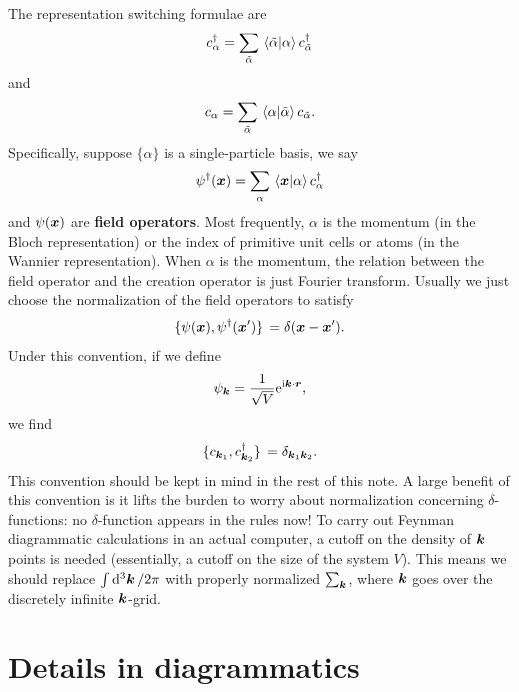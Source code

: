 \documentclass[hyperref, a4paper]{report}
\newcommand*{\ii}{\mathrm{i}}
\newcommand*{\ee}{\mathrm{e}}
\newcommand*{\concept}[1]{{\textbf{#1}}}
\begin{document}
The representation switching formulae are 
\begin{equation}
    c_\alpha^\dagger = \sum_{\tilde{\alpha}} \braket*{\tilde{\alpha}}{\alpha} c_{\tilde{\alpha}}^\dagger
\end{equation}
and 
\begin{equation}
    c_\alpha = \sum_{\tilde{\alpha}} \braket*{\alpha}{\tilde{\alpha}} c_{\tilde{\alpha}}.
\end{equation}
Specifically, suppose $\{\alpha\}$ is a single-particle basis, 
we say 
\begin{equation}
    \psi^\dagger(\vb*{x}) = \sum_{\alpha} \braket*{\vb*{x}}{\alpha} c_\alpha^\dagger
\end{equation}
and $\psi(\vb*{x})$ are \concept{field operators}.
Most frequently, $\alpha$ is the momentum (in the Bloch representation) 
or the index of primitive unit cells or atoms (in the Wannier representation).
When $\alpha$ is the momentum, 
the relation between the field operator and the creation operator 
is just Fourier transform.
Usually we just choose the normalization of the field operators to satisfy 
\begin{equation}
    \acomm*{\psi(\vb*{x})}{\psi^\dagger(\vb*{x}')} = \delta(\vb*{x} - \vb*{x}').
\end{equation}
Under this convention, 
if we define 
\begin{equation}
    \psi_{\vb*{k}} = \frac{1}{\sqrt{V}} \ee^{\ii \vb*{k} \cdot \vb*{r}},
\end{equation}
we find 
\begin{equation}
    \acomm*{c_{\vb*{k}_1}}{c^\dagger_{\vb*{k}_2}} = \delta_{\vb*{k}_1 \vb*{k}_2}.
\end{equation}
This convention should be kept in mind in the rest of this note.
A large benefit of this convention 
is it lifts the burden to worry about normalization concerning $\delta$-functions:
no $\delta$-function appears in the rules now!
To carry out Feynman diagrammatic calculations in an actual computer,
a cutoff on the density of $\vb*{k}$ points is needed
(essentially, a cutoff on the size of the system $V$).
This means we should replace $\int \dd[3]{\vb*{k}} / 2\pi $
with properly normalized $\sum_{\vb*{k}}$,
where $\vb*{k}$ goes over the discretely infinite $\vb*{k}$-grid.

\section{Details in diagrammatics}
\end{document}
